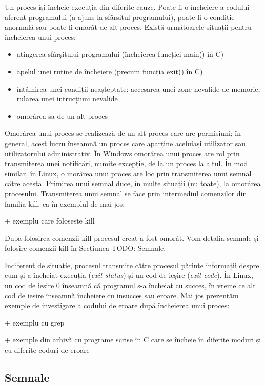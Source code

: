 Un proces își încheie execuția din diferite cauze. Poate fi o încheiere a
codului aferent programului (a ajuns la sfârșitul programului), poate fi o
condiție anormală sau poate fi omorât de alt proces. Există următoarele situații
pentru încheierea unui proces:

\begin{itemize}
	\item atingerea sfârșitului programului (încheierea funcției main() în C)
	\item apelul unei rutine de încheiere (precum funcția exit() în C)
	\item întâlnirea unei condiții neașteptate: accesarea unei zone nevalide
		de memorie, rularea unei intrucțiuni nevalide
	\item omorârea sa de un alt proces
\end{itemize}

Omorârea unui proces se realizează de un alt proces care are permisiuni; în
general, acest lucru înseamnă un proces care aparține aceluiași utilizator sau
utilizatorului administrativ. În Windows omorârea unui proces are rol prin
transmiterea unei notificări, numite excepție, de la un proces la altul. În mod
similar, în Linux, o morârea unui proces are loc prin transmiterea unui semnal
către acesta. Primirea unui semnal duce, în multe situații (nu toate), la
omorârea procesului. Transmiterea unui semnal se face prin intermediul
comenzilor din familia kill, ca în exemplul de mai jos:

+ exemplu care folosește kill

După folosirea comenzii kill procesul creat a fost omorât. Vom detalia semnale
și folosire comenzii kill în Secțiunea TODO: Semnale.

Indiferent de situație, procesul transmite către procesul părinte informații
despre cum și-a încheiat execuția (\textit{exit status}) și un cod de ieșire
(\textit{exit code}).  În Linux, un cod de ieșire 0 înseamnă că programul s-a
încheiat cu succes, în vreme ce alt cod de ieșire înseamnă încheiere cu insucces
sau eroare. Mai jos prezentăm exemple de investigare a codului de eroare după
încheierea unui proces:

+  exemplu cu grep

+  exemple din arhivă cu programe scrise în C care se încheie în diferite moduri
și cu diferite coduri de eroare

\subsection{Semnale}
\label{sec:procese-operatii-semnale}

